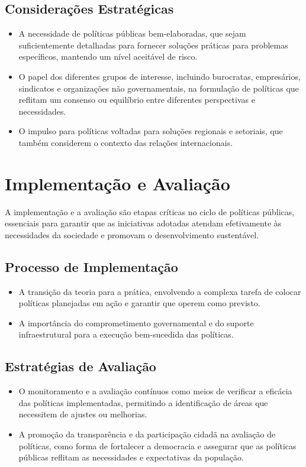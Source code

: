 \documentclass[
   article,       
   12pt,          
   oneside,       
   a4paper,       
   english,       
   brazil,        
   sumario=tradicional
   ]{abntex2}
\begin{document}
    \subsection{Considerações Estratégicas}
        \begin{itemize}
            \item A necessidade de políticas públicas bem-elaboradas, que sejam suficientemente detalhadas para fornecer soluções práticas para problemas específicos, mantendo um nível aceitável de risco.
            \item O papel dos diferentes grupos de interesse, incluindo burocratas, empresários, sindicatos e organizações não governamentais, na formulação de políticas que reflitam um consenso ou equilíbrio entre diferentes perspectivas e necessidades.
            \item O impulso para políticas voltadas para soluções regionais e setoriais, que também considerem o contexto das relações internacionais.
        \end{itemize}

\section{Implementação e Avaliação}
A implementação e a avaliação são etapas críticas no ciclo de políticas públicas, essenciais para garantir que as iniciativas adotadas atendam efetivamente às necessidades da sociedade e promovam o desenvolvimento sustentável.
    \subsection{Processo de Implementação}
        \begin{itemize}
            \item A transição da teoria para a prática, envolvendo a complexa tarefa de colocar políticas planejadas em ação e garantir que operem como previsto.
            \item A importância do comprometimento governamental e do suporte infraestrutural para a execução bem-sucedida das políticas.
        \end{itemize}
    \subsection{Estratégias de Avaliação}
        \begin{itemize}
            \item O monitoramento e a avaliação contínuos como meios de verificar a eficácia das políticas implementadas, permitindo a identificação de áreas que necessitem de ajustes ou melhorias.
            \item A promoção da transparência e da participação cidadã na avaliação de políticas, como forma de fortalecer a democracia e assegurar que as políticas públicas reflitam as necessidades e expectativas da população.
        \end{itemize}
\end{document}
